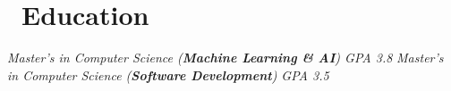 \documentclass[10pt]{resume}
\begin{document}
 


\vspace{-1em}
\section{\color{red} \faGraduationCap\ Education}
\vspace{-0.5em}
\vspace{-0.5em}
\hspace{1em}\textit{Master's in Computer Science (\textbf{Machine Learning \& AI})  \hfill GPA 3.8}
\vspace{-0.8em}
\vspace{-0.5em}
\hspace{1em}\textit{Master's in Computer Science (\textbf{Software Development})  \hfill GPA 3.5} \\
\vspace{-2em}
\end{document}
